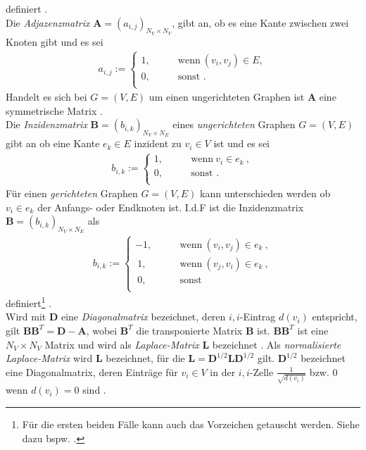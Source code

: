 \documentclass[12pt, a4paper]{report}
\begin{document}
definiert \cite{diestel2006graph}.\\
Die \textit{Adjazenzmatrix} $\textbf{A}=(a_{i,j})_{N_V \times N_V}$, gibt an, ob es eine Kante zwischen zwei Knoten gibt und es sei 
\begin{align}
a_{i,j} := \begin{cases}
1, \qquad &\text{wenn} \ (v_i,v_j) \in E,\\
0, \qquad &\text{sonst \ .}\\
\end{cases}
\end{align}
Handelt es sich bei $G=(V,E)$ um einen ungerichteten Graphen ist $\textbf{A}$ eine symmetrische Matrix \cite{kolaczyk2009statistical}.\\
Die \textit{Inzidenzmatrix} $\textbf{\~B}=(b_{i,k})_{N_V \times N_E}$ eines \textit{ungerichteten} Graphen $G=(V,E)$ gibt an ob eine Kante $e_k \in E$ inzident zu $v_i \in V$ ist \cite{kolaczyk2009statistical} und es sei
\begin{align}
b_{i,k} := \begin{cases}
1, \qquad &\text{wenn} \ v_i \in e_k \ ,\\
0, \qquad &\text{sonst .}\\
\end{cases}
\end{align}
Für einen \textit{gerichteten} Graphen $G=(V,E)$ kann unterschieden werden ob $v_i \in e_k$ der Anfangs- oder Endknoten ist. \mbox{I.d.F} ist die Inzidenzmatrix $\textbf{B}=(b_{i,k})_{N_V \times N_E}$ als
\begin{align}
b_{i,k} := \begin{cases}
-1, \qquad &\text{wenn} \ (v_i,v_j) \in e_k \ ,\\
\ 1, \qquad &\text{wenn} \ (v_j,v_i) \in e_k \ ,\\
\ 0, \qquad &\text{sonst}\\
\end{cases}
\end{align}
definiert\footnote{Für die ersten beiden Fälle kann auch das Vorzeichen getauscht werden. Siehe dazu bspw. .} \cite{brandes2005graphfunda}.\\
Wird mit $\textbf{D}$ eine \textit{Diagonalmatrix} bezeichnet, deren $i,i$-Eintrag $d(v_i)$ entspricht, gilt $\textbf{BB}^T=\textbf{D}-\textbf{A}$, wobei $\textbf{B}^T$ die transponierte Matrix $\textbf{B}$ ist. $\textbf{BB}^T$ ist eine $N_V \times N_V$ Matrix und wird als \textit{Laplace-Matrix} $\textbf{L}$ bezeichnet \cite{kolaczyk2009statistical}. Als \textit{normalisierte Laplace-Matrix} wird $\textbf{\~L}$ bezeichnet, für die $\textbf{\~L}=\textbf{D}^{1/2}\textbf{L}\textbf{D}^{1/2}$ gilt. $\textbf{D}^{1/2}$ bezeichnet eine Diagonalmatrix, deren Einträge für $v_i \in V$ in der $i,i$-Zelle $\frac{1}{\sqrt{d(v_i)}}$ bzw. $0$ wenn $d(v_i)=0$ sind \cite{brandes2005graphfunda}.\\
\end{document}
